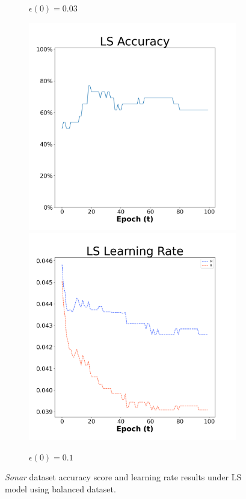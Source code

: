 \begin{figure}[H]
\begin{subfigure}{0.3\textwidth}
  \caption{$\epsilon(0)=0.03$}
\end{subfigure}\hfil %
\begin{subfigure}{0.3\textwidth}
  \includegraphics[width=\linewidth]{images/exper1/Sonar/LS_0.1_acc.png}
  \includegraphics[width=\linewidth]{images/exper1/Sonar/LS_0.1_lr.png}
  \caption{$\epsilon(0)=0.1$}
\end{subfigure}

\caption{\textit{Sonar} dataset accuracy score and learning rate results under LS model using balanced dataset.}
\end{figure}

